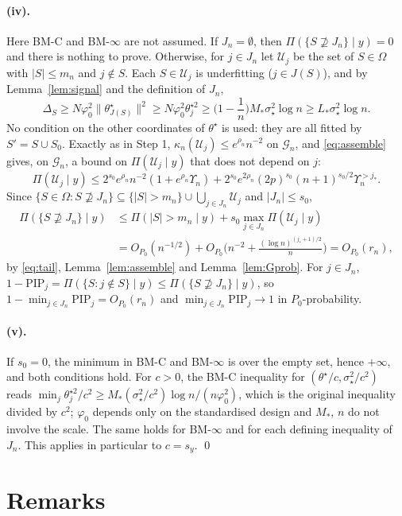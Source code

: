 \documentclass[11pt]{article}
\theoremstyle{definition}
\newcommand{\Pp}{P_0}
\newcommand{\1}{\mathbf 1}
\newcommand{\Gn}{\mathcal G_n}
\newcommand{\Uc}{\mathcal U}
\newcommand{\sst}{\sigma_\star^2}
\newcommand{\vp}{\varphi_0^2}
\begin{document}
\paragraph{(iv).} Here BM-C and BM-$\infty$ are not assumed. If $J_n=\emptyset$, then $\Pi(\{S\not\supseteq J_n\}\mid y)=0$ and there is nothing to prove. Otherwise, for $j\in J_n$ let $\Uc_j$ be the set of $S\in\Omega$ with $|S|\le m_n$ and $j\notin S$. Each $S\in\Uc_j$ is underfitting ($j\in J(S)$), and by Lemma~\ref{lem:signal} and the definition of $J_n$,
\[
\Delta_S\ge N\vp\|\theta^\star_{J(S)}\|^2\ge N\vp\theta^{\star2}_j\ge\Big(1-\frac1n\Big)M_*\sst\log n\ge L_*\sst\log n .
\]
No condition on the other coordinates of $\theta^\star$ is used: they are all fitted by $S'=S\cup S_0$. Exactly as in Step 1, $\kappa_n(\Uc_j)\le e^{\rho_n}n^{-2}$ on $\Gn$, and \eqref{eq:assemble} gives, on $\Gn$, a bound on $\Pi(\Uc_j\mid y)$ that does not depend on $j$:
\[
\Pi(\Uc_j\mid y)\le2^{s_0}e^{\rho_n}n^{-2}(1+e^{\rho_n}\Upsilon_n)+2^{s_0}e^{2\rho_n}(2p)^{s_0}(n+1)^{s_0/2}\Upsilon_n^{>j_*}.
\]
Since $\{S\in\Omega:S\not\supseteq J_n\}\subseteq\{|S|>m_n\}\cup\bigcup_{j\in J_n}\Uc_j$ and $|J_n|\le s_0$,
\[
\begin{aligned}\Pi(\{S\not\supseteq J_n\}\mid y)&\le\Pi(|S|>m_n\mid y)+s_0\max_{j\in J_n}\Pi(\Uc_j\mid y)\\&=O_{\Pp}(n^{-1/2})+O_{\Pp}\Big(n^{-2}+\frac{(\log n)^{(j_*+1)/2}}n\Big)=O_{\Pp}(r_n),\end{aligned}
\]
by \eqref{eq:tail}, Lemma~\ref{lem:assemble} and Lemma~\ref{lem:Gprob}. For $j\in J_n$, $1-\mathrm{PIP}_j=\Pi(\{S:j\notin S\}\mid y)\le\Pi(\{S\not\supseteq J_n\}\mid y)$, so $1-\min_{j\in J_n}\mathrm{PIP}_j=O_{\Pp}(r_n)$ and $\min_{j\in J_n}\mathrm{PIP}_j\to1$ in $\Pp$-probability.

\paragraph{(v).} If $s_0=0$, the minimum in BM-C and BM-$\infty$ is over the empty set, hence $+\infty$, and both conditions hold. For $c>0$, the BM-C inequality for $(\theta^\star/c,\sst/c^2)$ reads $\min_j\theta^{\star2}_j/c^2\ge M_*(\sst/c^2)\log n/(n\vp)$, which is the original inequality divided by $c^2$; $\varphi_0$ depends only on the standardised design and $M_*$, $n$ do not involve the scale. The same holds for BM-$\infty$ and for each defining inequality of $J_n$. This applies in particular to $c=s_y$. \qed

\section{Remarks}
\end{document}
